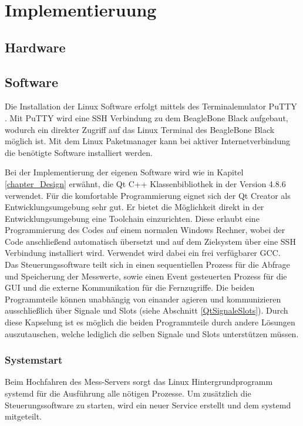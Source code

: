 \chapter{Implementieruung}
\label{chapter_Implementierung}

\section{Hardware}

\section{Software}

Die Installation der Linux Software erfolgt mittels des Terminalemulator PuTTY \cite{putty}. Mit \mbox{PuTTY} wird eine \ac{SSH} Verbindung zu dem BeagleBone Black aufgebaut, wodurch ein direkter Zugriff auf das Linux Terminal des BeagleBone Black möglich ist. Mit dem Linux Paketmanager kann bei aktiver Internetverbindung die benötigte Software installiert werden.\ 

Bei der Implementierung der eigenen Software wird wie in Kapitel \ref{chapter_Design} erwähnt, die Qt C++ Klassenbibliothek in der Version 4.8.6 verwendet. Für die komfortable Programmierung eignet sich der Qt Creator als Entwicklungsumgebung sehr gut. Er bietet die Möglichkeit direkt in der Entwicklungsumgebung eine Toolchain einzurichten. Diese erlaubt eine Programmierung des Codes auf einem normalen Windows Rechner, wobei der Code anschließend automatisch übersetzt und auf dem Zielsystem über eine \ac{SSH} Verbindung installiert wird. Verwendet wird dabei ein frei verfügbarer \ac{GCC}.\\
Das Steuerungssoftware teilt sich in einen sequentiellen Prozess für die Abfrage und Speicherung der Messwerte, sowie einen Event gesteuerten Prozess für die \ac{GUI} und die externe Kommunikation für die Fernzugriffe. 
Die beiden Programmteile können unabhängig von einander agieren und kommunizieren ausschließlich über Signale und Slots (siehe Abschnitt \ref{QtSignaleSlots}). Durch diese Kapselung ist es möglich die beiden Programmteile durch andere Lösungen auszutauschen, welche lediglich die selben Signale und Slots unterstützen müssen.

\subsection{Systemstart}

Beim Hochfahren des Mess-Servers sorgt das Linux Hintergrundprogramm systemd für die Ausführung alle nötigen Prozesse. Um zusätzlich die Steuerungssoftware zu starten, wird ein neuer Service erstellt und dem systemd mitgeteilt.\\

